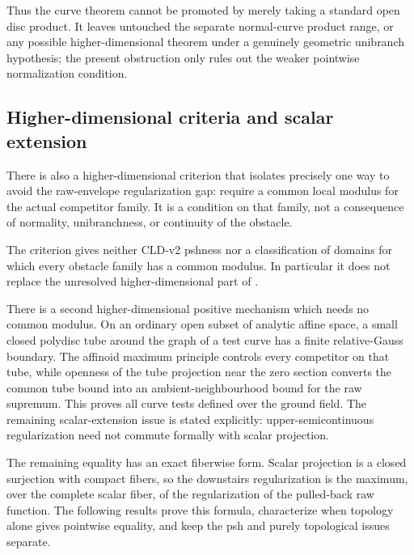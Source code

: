 Thus the curve theorem cannot be promoted by merely taking a standard open
disc product.  It leaves untouched the separate normal-curve product range,
or any possible higher-dimensional theorem under a genuinely geometric
unibranch hypothesis; the present obstruction only rules out the weaker
pointwise normalization condition.

\subsection{Higher-dimensional criteria and scalar extension}
\label{sec:ch15-envelope-scalar-extension}

There is also a higher-dimensional criterion that isolates precisely one way
to avoid the raw-envelope regularization gap: require a common local modulus
for the actual competitor family.  It is a condition on that family, not a
consequence of normality, unibranchness, or continuity of the obstacle.




The criterion gives neither CLD-v2 pshness nor a classification of domains
for which every obstacle family has a common modulus.  In particular it does
not replace the unresolved higher-dimensional part of
.

There is a second higher-dimensional positive mechanism which needs no
common modulus.  On an ordinary open subset of analytic affine space, a
small closed polydisc tube around the graph of a test curve has a finite
relative-Gauss boundary.  The affinoid maximum principle controls every
competitor on that tube, while openness of the tube projection near the
zero section converts the common tube bound into an ambient-neighbourhood
bound for the raw supremum.  This proves all curve tests defined over the
ground field.  The remaining scalar-extension issue is stated explicitly:
upper-semicontinuous regularization need not commute formally with scalar
projection.




The remaining equality has an exact fiberwise form.  Scalar projection is
a closed surjection with compact fibers, so the downstairs regularization
is the maximum, over the complete scalar fiber, of the regularization of
the pulled-back raw function.  The following results prove this formula,
characterize when topology alone gives pointwise equality, and keep the
psh and purely topological issues separate.


